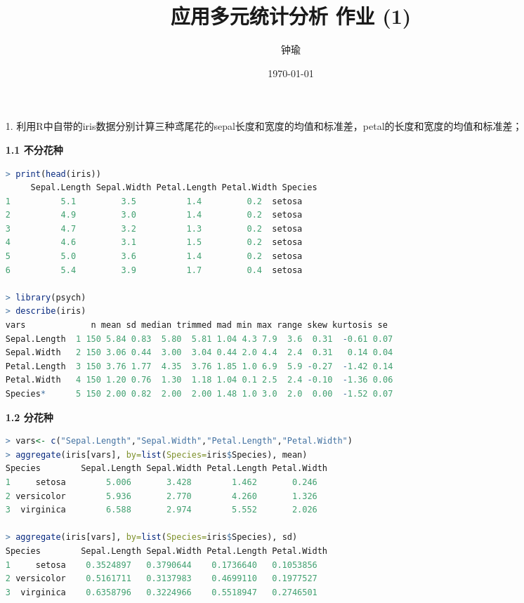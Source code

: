 \documentclass[11pt,a4paper]{ctexart}
\title{应用多元统计分析 作业 (1)}
\author{钟瑜 \quad 222018314210044}
\date{\today}
\begin{document}
\maketitle
\pagestyle{plain}%
\begin{enumerate}
	
\item[1.]利用R中自带的iris数据分别计算三种鸢尾花的sepal长度和宽度的均值和标准差，petal的长度和宽度的均值和标准差；

\textbf{1.1 不分花种}
\begin{lstlisting}[language=r]
> print(head(iris))
     Sepal.Length Sepal.Width Petal.Length Petal.Width Species
1          5.1         3.5          1.4         0.2  setosa
2          4.9         3.0          1.4         0.2  setosa
3          4.7         3.2          1.3         0.2  setosa
4          4.6         3.1          1.5         0.2  setosa
5          5.0         3.6          1.4         0.2  setosa
6          5.4         3.9          1.7         0.4  setosa

> library(psych)
> describe(iris)
vars             n mean sd median trimmed mad min max range skew kurtosis se
Sepal.Length  1 150 5.84 0.83  5.80  5.81 1.04 4.3 7.9  3.6  0.31  -0.61 0.07
Sepal.Width   2 150 3.06 0.44  3.00  3.04 0.44 2.0 4.4  2.4  0.31   0.14 0.04
Petal.Length  3 150 3.76 1.77  4.35  3.76 1.85 1.0 6.9  5.9 -0.27  -1.42 0.14
Petal.Width   4 150 1.20 0.76  1.30  1.18 1.04 0.1 2.5  2.4 -0.10  -1.36 0.06
Species*      5 150 2.00 0.82  2.00  2.00 1.48 1.0 3.0  2.0  0.00  -1.52 0.07
\end{lstlisting}
\textbf{1.2 分花种}
\begin{lstlisting}[language=r]
> vars<- c("Sepal.Length","Sepal.Width","Petal.Length","Petal.Width")
> aggregate(iris[vars], by=list(Species=iris$Species), mean)
Species        Sepal.Length Sepal.Width Petal.Length Petal.Width
1     setosa        5.006       3.428        1.462       0.246
2 versicolor        5.936       2.770        4.260       1.326
3  virginica        6.588       2.974        5.552       2.026

> aggregate(iris[vars], by=list(Species=iris$Species), sd)
Species        Sepal.Length Sepal.Width Petal.Length Petal.Width
1     setosa    0.3524897   0.3790644    0.1736640   0.1053856
2 versicolor    0.5161711   0.3137983    0.4699110   0.1977527
3  virginica    0.6358796   0.3224966    0.5518947   0.2746501
\end{lstlisting}


\end{enumerate}
\end{document}
